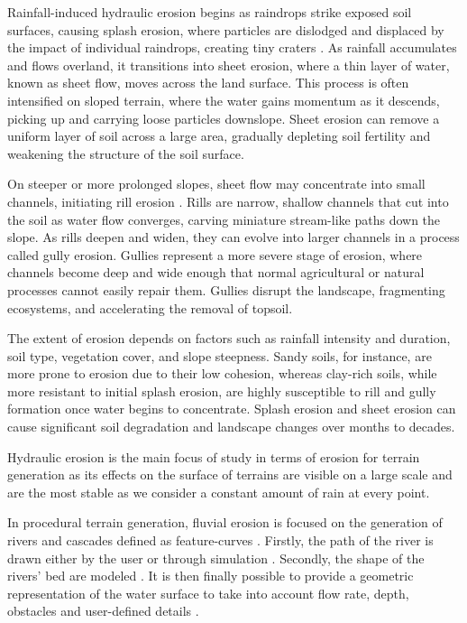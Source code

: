 Rainfall-induced hydraulic erosion begins as raindrops strike exposed soil surfaces, causing splash erosion, where particles are dislodged and displaced by the impact of individual raindrops, creating tiny craters \cite{Li2024,Valette2005}. As rainfall accumulates and flows overland, it transitions into sheet erosion, where a thin layer of water, known as sheet flow, moves across the land surface. This process is often intensified on sloped terrain, where the water gains momentum as it descends, picking up and carrying loose particles downslope. Sheet erosion can remove a uniform layer of soil across a large area, gradually depleting soil fertility and weakening the structure of the soil surface.

On steeper or more prolonged slopes, sheet flow may concentrate into small channels, initiating rill erosion \cite{Gatto2000}. Rills are narrow, shallow channels that cut into the soil as water flow converges, carving miniature stream-like paths down the slope. As rills deepen and widen, they can evolve into larger channels in a process called gully erosion. Gullies represent a more severe stage of erosion, where channels become deep and wide enough that normal agricultural or natural processes cannot easily repair them. Gullies disrupt the landscape, fragmenting ecosystems, and accelerating the removal of topsoil.

The extent of erosion depends on factors such as rainfall intensity and duration, soil type, vegetation cover, and slope steepness. Sandy soils, for instance, are more prone to erosion due to their low cohesion, whereas clay-rich soils, while more resistant to initial splash erosion, are highly susceptible to rill and gully formation once water begins to concentrate. Splash erosion and sheet erosion can cause significant soil degradation and landscape changes over months to decades.

\smallConclusion

Hydraulic erosion is the main focus of study in terms of erosion for terrain generation as its effects on the surface of terrains are visible on a large scale and are the most stable as we consider a constant amount of rain at every point.

In procedural terrain generation, fluvial erosion is focused on the generation of rivers and cascades defined as feature-curves \cite{Emilien2015}. Firstly, the path of the river is drawn either by the user \cite{Hnaidi2010} or through simulation \cite{ParisThesis}. Secondly, the shape of the rivers' bed are modeled \cite{Genevaux2013}. It is then finally possible to provide a geometric representation of the water surface to take into account flow rate, depth, obstacles and user-defined details \cite{Peytavie2019}.

